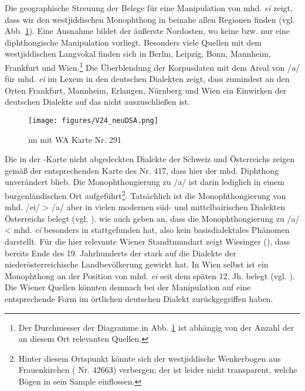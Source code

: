 Die geographische Streuung der Belege für eine Manipulation von mhd. \textit{ei} zeigt, dass wir den westjiddischen Monophthong in beinahe allen Regionen finden (vgl. Abb. \ref{karteV24DSA}). Eine Ausnahme bildet der äußerste Nordosten, wo keine bzw. nur eine diphthongische Manipulation vorliegt. Besonders viele Quellen mit dem westjiddischen Langvokal finden sich in Berlin, Leipzig, Bonn, Mannheim, Frankfurt und Wien.\footnote{Der Durchmesser der Diagramme in Abb. \ref{karteV24DSA} ist abhängig von der Anzahl der an diesem Ort relevanten Quellen.} Die Überblendung der Korpusdaten mit dem Areal von /\textit{a\textlengthmark}/ für mhd. \textit{ei} im Lexem  in den deutschen Dialekten zeigt, dass zumindest an den Orten Frankfurt, Mannheim, Erlangen, Nürnberg und Wien ein Einwirken der deutschen Dialekte auf das  nicht auszuschließen ist. \\
		
		\begin{figure}[h!]
		\centering
\texttt{[image: figures/V24\_neuDSA.png]}
		\caption{\label{karteV24DSA}   im  mit WA Karte Nr. 291}
		\end{figure}
 \FloatBarrier


Die in der -Karte nicht abgedeckten Dialekte der Schweiz und Österreichs zeigen gemäß der entsprechenden Karte des  Nr. 417, dass hier der mhd. Diphthong unverändert blieb. Die Monophthongierung zu /a\textlengthmark/ ist darin lediglich in einem burgenländischen Ort aufgeführt\footnote{Hinter diesem Ortspunkt könnte sich der westjiddische Wenkerbogen aus Frauenkirchen ( Nr. 42663) verbergen; der   ist leider nicht transparent, welche Bögen in sein Sample einflossen.}. Tatsächlich ist die Monophthongierung von mhd. /ei/ > /a\textlengthmark/ aber in vielen modernen süd- und mittelbairischen Dialekten Österreichs belegt (vgl. \cite{Wiesinger2001}). \textcite[233]{Schirmunski1962} wie auch \textcite{Wiesinger2001} geben an, dass die Monophthongierung zu /a\textlengthmark/ < mhd. \textit{ei} besonders in  stattgefunden hat, also kein basisdialektales Phänomen darstellt. Für die hier relevante Wiener Standtmundart zeigt Wiesinger (\citeyear[92f]{Wiesinger2001}), dass bereits Ende des 19. Jahrhunderts der  stark auf die Dialekte der niederösterreichische Landbevölkerung gewirkt hat. In Wien selbst ist ein Monophthong an der Position von mhd. \textit{ei} seit dem späten 12. Jh. belegt (vgl. \cite[113]{Wiesinger2001}). Die Wiener Quellen könnten demnach bei der Manipulation auf eine entsprechende Form im örtlichen deutschen Dialekt zurückgegriffen haben.
 
